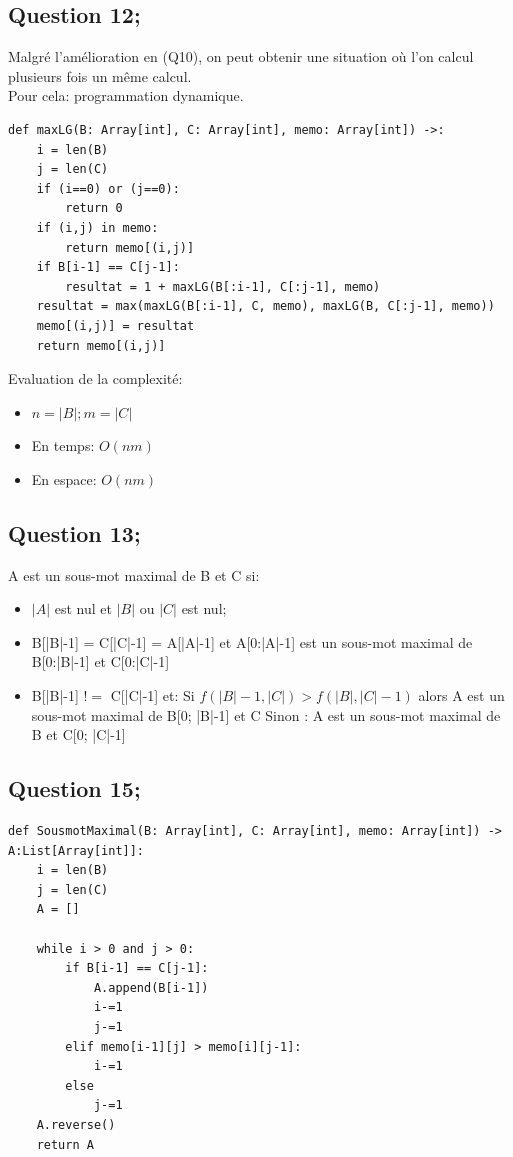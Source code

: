 \documentclass{article}
\begin{document}
\subsection*{Question 12;}
Malgré l'amélioration en (Q10), on peut obtenir une situation où l'on calcul plusieurs fois un même calcul.
\\
Pour cela: programmation dynamique.

\begin{lstlisting}[label=python, caption={\textit{maxLG} programmation dynamique}]
def maxLG(B: Array[int], C: Array[int], memo: Array[int]) ->:
    i = len(B)
    j = len(C)
    if (i==0) or (j==0):
        return 0
    if (i,j) in memo:
        return memo[(i,j)]
    if B[i-1] == C[j-1]:
        resultat = 1 + maxLG(B[:i-1], C[:j-1], memo)
    resultat = max(maxLG(B[:i-1], C, memo), maxLG(B, C[:j-1], memo))
    memo[(i,j)] = resultat
    return memo[(i,j)]
\end{lstlisting}

Evaluation de la complexité:
\begin{itemize}
    \item $ n = |B|; m = |C| $
    \item En temps: $O(nm)$
    \item En espace: $O(nm)$
\end{itemize}

\subsection*{Question 13;}
A est un sous-mot maximal de B et C si:
\begin{itemize}
    \item $|A|$ est nul et $|B| \text{ ou } |C|$ est nul;
    \item B[|B|-1] = C[|C|-1] = A[|A|-1] et A[0:|A|-1] est un sous-mot maximal de B[0:|B|-1] et C[0:|C|-1]
    \item B[|B|-1] $!=$ C[|C|-1] et: 
    \subitem Si $f(|B|-1, |C|) > f(|B|, |C|-1)$ alors A est un sous-mot maximal de B[0; |B|-1] et C
    \subitem Sinon : A est un sous-mot maximal de B et C[0; |C|-1]
\end{itemize}

\subsection*{Question 15;}

\begin{lstlisting}[label=python, caption={\textit{SousmotMaximal}}]
def SousmotMaximal(B: Array[int], C: Array[int], memo: Array[int]) -> A:List[Array[int]]:
    i = len(B)
    j = len(C) 
    A = []

    while i > 0 and j > 0: 
        if B[i-1] == C[j-1]:
            A.append(B[i-1])
            i-=1
            j-=1
        elif memo[i-1][j] > memo[i][j-1]:
            i-=1
        else
            j-=1
    A.reverse()
    return A
\end{lstlisting}
\end{document}
